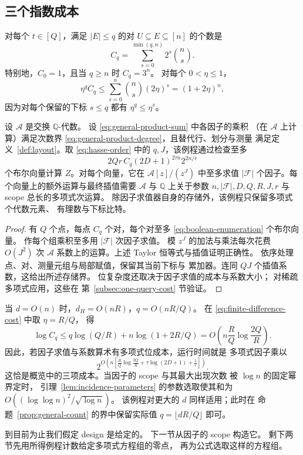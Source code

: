 \subsection{三个指数成本}
\label{subsec:three-costs}
对每个 $t\in[Q]$，满足 $|E|\le q$ 的对
$U\subseteq E\subseteq[n]$ 的个数是
\begin{equation}\label{eq:pair-count}
 C_q=\sum_{s=0}^{\min(q,n)}2^s\binom ns.
\end{equation}
特别地，$C_0=1$，且当 $q\ge n$ 时 $C_q=3^n$。
对每个 $0<\eta\le1$，
\begin{equation}\label{eq:finite-difference-cost}
 \eta^qC_q\le\sum_{s=0}^n\binom ns(2\eta)^s=(1+2\eta)^n,
\end{equation}
因为对每个保留的下标 $s\le q$ 都有
$\eta^q\le\eta^s$。

\begin{proposition}[公共计数例程]\label{prop:general-count}
设 $\mathcal A$ 是交换 $\mathbb Q$-代数。
设 \eqref{eq:general-product-sum} 中各因子的乘积
（在 $\mathcal A$ 上计算）满足次数界
\eqref{eq:general-product-degree}，且替代行、划分与测量
满足定义~\ref{def:layout}。取 \eqref{eq:hasse-order}
中的 $q,J$，该例程通过检查至多
\[
 2Qr\,C_q(2D+1)^{2\tau n}2^{2n/r}
\]
个布尔向量计算 $Z$。对每个向量，它在
$\mathcal A[z]/(z^J)$ 中至多求值 $|\mathcal F|$
个因子。每个向量上的额外运算与最终插值需要
$\mathcal A$ 与 $\mathbb Q$ 上关于参数
$n,|\mathcal F|,D,Q,R,J,r$ 与 scope 总长的多项式次运算。
除因子求值器自身的存储外，该例程只保留多项式个代数元素、
有理数与下标比特。
\end{proposition}
\begin{proof}
有 $Q$ 个点，每点 $C_q$ 个对，每个对至多
\eqref{eq:boolean-enumeration} 个布尔向量。
作每个组乘积至多用 $|\mathcal F|$ 次因子求值。
模 $z^J$ 的加法与乘法每次花费 $O(J^2)$ 次 $\mathcal A$
系数上的运算。上述 Taylor 恒等式与插值证明正确性。
依序处理点、对、测量元组与局部赋值，保留其当前下标与
累加器。连同 $QJ$ 个插值系数，这给出所述存储界。
位复杂度还取决于因子求值的成本与系数大小；
对稀疏多项式应用，这些在
第~\ref{subsec:one-query-cost} 节验证。
\end{proof}

当 $d=O(n)$ 时，$d_H=O(nR)$，$q=O(nR/Q)$。
在 \eqref{eq:finite-difference-cost} 中取 $\eta=R/Q$，
得
\[
 \log C_q\le q\log(Q/R)+n\log(1+2R/Q)
     =O\!\left(n\frac RQ\log\frac{2Q}{R}\right).
\]
因此，若因子求值与系数算术有多项式位成本，运行时间就是
多项式因子乘以
\begin{equation}\label{eq:three-costs}
 2^{O\left(n\left[
       \frac RQ\log\frac{2Q}{R}
       +\tau\log(2D+1)+\frac1r\right]\right)}.
\end{equation}
这恰是概览中的三项成本。当因子的 scope 与其最大出现次数
被 $\log n$ 的固定幂界定时，
引理~\ref{lem:incidence-parameters} 的参数选取使其和为
$O((\log\log n)^2/\sqrt{\log n})$。
该例程对更大的 $d$ 同样适用；此时在
命题~\ref{prop:general-count} 的界中保留实际值
$q=\lfloor dR/Q\rfloor$ 即可。

到目前为止我们假定 design 是给定的。
下一节从因子的 scope 构造它。
剩下两节先用所得例程计数给定多项式方程组的零点，
再为公式选取这样的方程组。
